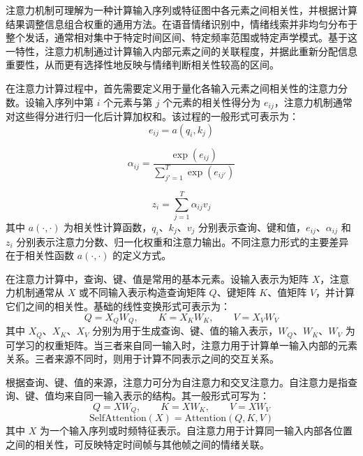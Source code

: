 注意力机制可理解为一种计算输入序列或特征图中各元素之间相关性，并根据计算结果调整信息组合权重的通用方法\cite{mirsamadi2017automatic,zou2022speech}。在语音情绪识别中，情绪线索并非均匀分布于整个发话，通常相对集中于特定时间区间、特定频率范围或特定声学模式\cite{liu2023discriminative,he2023multiple}。基于这一特性，注意力机制通过计算输入内部元素之间的关联程度，并据此重新分配信息重要性，从而更有选择性地反映与情绪判断相关性较高的区间。

在注意力计算过程中，首先需要定义用于量化各输入元素之间相关性的注意力分数。设输入序列中第 $i$ 个元素与第 $j$ 个元素的相关性得分为 $e_{ij}$，注意力机制通常对这些得分进行归一化后计算加权和。该过程的一般形式可表示为：
\begin{equation}
e_{ij} = a(q_i, k_j)
\label{eq:attn_general_score}
\end{equation}

\begin{equation}
\alpha_{ij} = \frac{\exp(e_{ij})}{\sum_{j'=1}^{T}\exp(e_{ij'})}
\label{eq:attn_general_alpha}
\end{equation}

\begin{equation}
z_i = \sum_{j=1}^{T}\alpha_{ij} v_j
\label{eq:attn_general_output}
\end{equation}
其中 $a(\cdot,\cdot)$ 为相关性计算函数，$q_i$、$k_j$、$v_j$ 分别表示查询、键和值，$e_{ij}$、$\alpha_{ij}$ 和 $z_i$ 分别表示注意力分数、归一化权重和注意力输出。不同注意力形式的主要差异在于相关性函数 $a(\cdot,\cdot)$ 的定义方式\cite{chen2023dwformer,wang2024swin,he2023multiple}。

在注意力计算中，查询、键、值是常用的基本元素。设输入表示为矩阵 $X$，注意力机制通常从 $X$ 或不同输入表示构造查询矩阵 $Q$、键矩阵 $K$、值矩阵 $V$，并计算它们之间的相关性。基础的线性变换形式可表示为：
\begin{equation}
Q = X_Q W_Q,\qquad K = X_K W_K,\qquad V = X_V W_V
\label{eq:qkv_linear_general}
\end{equation}
其中 $X_Q$、$X_K$、$X_V$ 分别为用于生成查询、键、值的输入表示，$W_Q$、$W_K$、$W_V$ 为可学习的权重矩阵。当三者来自同一输入时，注意力用于计算单一输入内部的元素关系。三者来源不同时，则用于计算不同表示之间的交互关系\cite{chen2023dwformer,wang2024swin,he2023multiple}。

根据查询、键、值的来源，注意力可分为自注意力和交叉注意力。自注意力是指查询、键、值均来自同一输入表示的结构。其一般形式可写为：
\begin{equation}
Q = XW_Q,\qquad K = XW_K,\qquad V = XW_V
\label{eq:self_qkv}
\end{equation}
\begin{equation}
\mathrm{SelfAttention}(X) = \mathrm{Attention}(Q,K,V)
\label{eq:self_attention}
\end{equation}
其中 $X$ 为一个输入序列或时频特征表示。自注意力用于计算同一输入内部各位置之间的相关性，可反映特定时间帧与其他帧之间的情绪关联\cite{mirsamadi2017automatic,zou2022speech,chen2023dwformer}。

